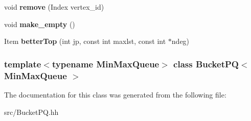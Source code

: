 \begin{DoxyCompactItemize}
\item 
\hypertarget{classBucketPQ_ae3cb097d11027f3e8277508dcfcf9a67}{
void {\bfseries remove} (Index vertex\_\-id)}
\label{classBucketPQ_ae3cb097d11027f3e8277508dcfcf9a67}

\item 
\hypertarget{classBucketPQ_af468d18437d36b4afc634c53f34b05fc}{
void {\bfseries make\_\-empty} ()}
\label{classBucketPQ_af468d18437d36b4afc634c53f34b05fc}

\item 
\hypertarget{classBucketPQ_a1eabfcc3affee86738816d259ebac587}{
Item {\bfseries betterTop} (int jp, const int maxlst, const int $\ast$ndeg)}
\label{classBucketPQ_a1eabfcc3affee86738816d259ebac587}

\end{DoxyCompactItemize}
\subsubsection*{template$<$typename MinMaxQueue$>$ class BucketPQ$<$ MinMaxQueue $>$}



The documentation for this class was generated from the following file:\begin{DoxyCompactItemize}
\item 
src/BucketPQ.hh\end{DoxyCompactItemize}
